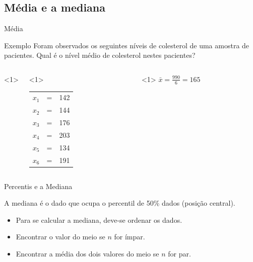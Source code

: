\documentclass{beamer}
\begin{document}
\subsection{Média e a mediana}

\begin{frame}{Média}
  \begin{exampleblock}{Exemplo}
    Foram observados os seguintes níveis de colesterol de uma amostra
    de pacientes. Qual é o nível médio de colesterol nestes pacientes?

    \begin{columns}<1>
      \begin{column}{5cm}<1>
        \begin{tabular}{ccc}
          $x_1$ &=&142\\
          $x_2$ &=&144\\
          $x_3$ &=&176\\
          $x_4$ &=&203\\
          $x_5$ &=&134\\
          $x_6$ &=&191\\
        \end{tabular}
      \end{column}
      \begin{column}{5cm}<1>
        $\bar{x} = \frac{990}{6} = 165$
      \end{column}
    \end{columns}
  \end{exampleblock}
\end{frame}

\begin{frame}{Percentis e a Mediana}
  \begin{definition}
    A mediana é o dado que ocupa o percentil de 50\% dados (\alert{posição central}).
  \end{definition}
  \begin{itemize}
  \item Para se calcular a mediana, deve-se ordenar os dados.
  \item Encontrar o valor do \alert{meio} se $n$ for ímpar.
  \item Encontrar a média dos dois valores do \alert{meio} se $n$ for par.
  \end{itemize}
\end{frame}
\end{document}
